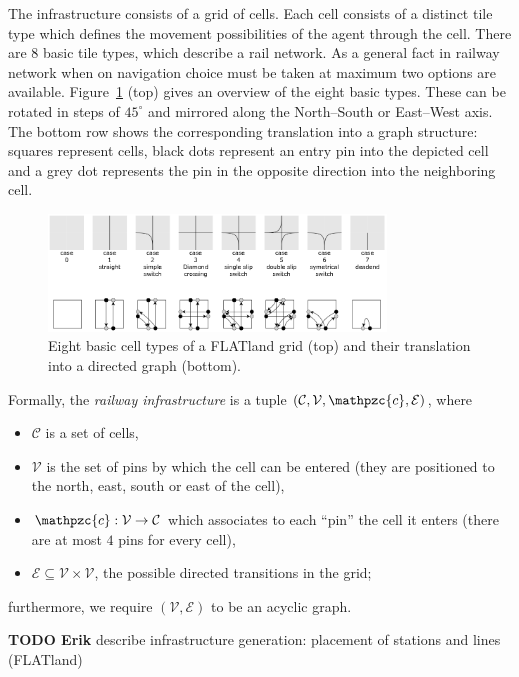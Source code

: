 \documentclass{article}
\begin{document}
The infrastructure consists of a grid of cells. Each cell consists of a distinct tile type which defines the movement possibilities of the agent through the cell. There are 8 basic tile types, which describe a rail network. As a general fact in railway network when on navigation choice must be taken at maximum two options are available.
%
Figure~\ref{fig:H1_railway_elements} (top) gives an overview of the eight basic types. These can be rotated in steps of $45^\circ$ and mirrored along the North--South or East--West axis. The bottom row shows the corresponding translation into a graph structure: squares represent cells, black dots represent an entry pin into the depicted cell and a grey dot represents the pin in the opposite direction into the neighboring cell.
%
\begin{figure}[hbtp]
	\centering
  \includegraphics[width=0.8\textwidth]{Figures/03_pipeline/H1_railway_elements.png}
	\caption{Eight basic cell types of a FLATland grid (top) and their translation into a directed graph (bottom).}
	\label{fig:H1_railway_elements}
\end{figure}
%
Formally, the \emph{railway infrastructure} is a tuple  $(\mathcal{C}, \mathcal{V}, \mathpzc{c}, \mathcal{E})$, where
\begin{itemize}
    \item $\mathcal{C}$ is a set of cells,
    \item $\mathcal{V}$ is the set of pins by which the cell can be entered (they are positioned to the north, east, south or east of the cell),
    \item $\mathpzc{c}: \mathcal{V} \to \mathcal{C}$ which associates to each ``pin'' the cell it enters (there are at most $4$ pins for every cell),
    \item $\mathcal{E} \subseteq \mathcal{V} \times \mathcal{V}$, the possible directed transitions in the grid;
\end{itemize}
furthermore, we require $(\mathcal{V},\mathcal{E})$ to be an acyclic graph.



\begin{mdframed}
{\bf TODO Erik} describe infrastructure generation: placement of stations and lines (FLATland)
\end{mdframed}
\end{document}
